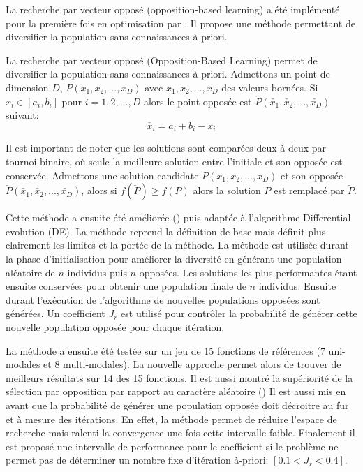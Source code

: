 La recherche par vecteur opposé (opposition-based learning) a été implémenté pour la première fois
en optimisation par \cite{Tizhoosh2005695,Rahnamayan2008155}. Il propose une méthode permettant de diversifier la
population sans connaissances à-priori.
\begin{Def}\label{def:oblm}
La recherche par vecteur opposé (Opposition-Based Learning) permet de diversifier la
population sans connaissances à-priori.
Admettons un point de dimension $D$, $P(x_{1}, x_{2}, ..., x_{D})$ avec
$x_{1}, x_{2}, ..., x_{D}$ des valeurs bornées. Si $x_{i} \in [a_{i}, b_{i}]$ pour
$i = 1, 2, ..., D$ alors le point opposée est $\check{P}(\check{x_{1}}, \check{x_{2}}, ..., \check{x_{D}})$ suivant:
\[\check{x_{i}} = a_{i} + b_{i} - x_{i}\]
\end{Def}

Il est important de noter que les solutions sont comparées deux à deux par tournoi binaire, où
seule la meilleure solution entre l’initiale et son opposée est conservée. Admettons une solution
candidate $P(x_{1}, x_{2}, ..., x_{D})$ et son opposée $\check{P}(\check{x_{1}}, \check{x_{2}}, ..., \check{x_{D}})$,
alors si $f(\check{P}) \geq f(P)$ alors la solution $P$ est remplacé par $\check{P}$.

Cette méthode a ensuite été améliorée (\cite{Rahnamayan2008155}) puis adaptée à
l’algorithme Differential evolution (DE). La méthode reprend la définition de base
mais définit plus clairement les limites et la portée de la méthode.
La méthode est utilisée durant la phase d’initialisation pour améliorer la diversité
en générant une population aléatoire de $n$ individus puis $n$ opposées.
Les solutions les plus performantes étant ensuite conservées pour obtenir une population
finale de $n$ individus.
Ensuite durant l’exécution de l’algorithme de nouvelles populations opposées sont générées.
Un coefficient $J_r$ est utilisé pour contrôler la probabilité de générer cette nouvelle
population opposée pour chaque itération.

La méthode a ensuite été testée sur un jeu de 15 fonctions de références (7 uni-modales
et 8 multi-modales). La nouvelle approche permet alors de trouver de meilleurs
résultats sur 14 des 15 fonctions. Il est aussi montré la supériorité de la
sélection par opposition par rapport au caractère aléatoire (\cite{Rahnamayan2008155,Rahnamayan2008906})
Il est aussi mis en avant que la probabilité de générer une population opposée
doit décroitre au fur et à mesure des itérations. En effet, la méthode permet de
réduire l’espace de recherche mais ralenti la convergence une fois cette intervalle
faible. Finalement il est proposé une intervalle de performance pour le coefficient si le problème
ne permet pas de déterminer un nombre fixe d’itération à-priori: $[0.1 < J_r < 0.4]$.

